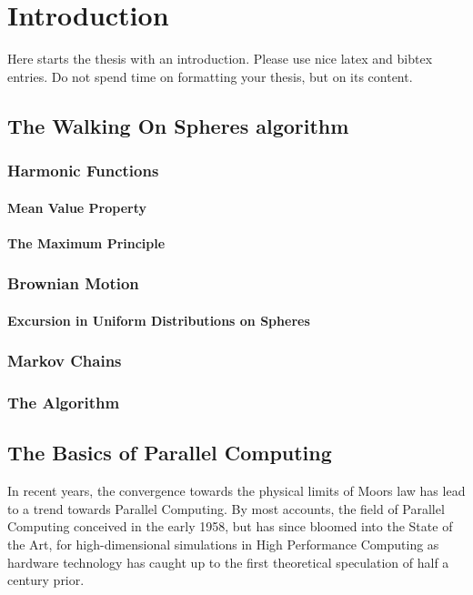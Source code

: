 \chapter{Introduction}
\label{chapter:Introduction}



Here starts the thesis with an introduction. Please use nice latex and bibtex entries\cite{Sabelfeld}. Do not spend time on formatting your thesis, but on its content.

\section{The Walking On Spheres algorithm}
\subsection{Harmonic Functions}
\subsubsection{Mean Value Property}
\subsubsection{The Maximum Principle}
\subsection{Brownian Motion}
\subsubsection{Excursion in Uniform Distributions on Spheres}
\subsection{Markov Chains}
\subsection{The Algorithm}



\section{The Basics of Parallel Computing}
In recent years, the convergence towards the physical limits of Moors law has lead to a
trend towards Parallel Computing\cite{Kumar}\cite{Markov}.  By most accounts, the
field of Parallel Computing conceived in the early 1958\cite{Gill}, but has
since bloomed into the State of the Art, for high-dimensional simulations in
High Performance Computing as hardware technology has caught up to the first
theoretical speculation of half a century prior. \par

